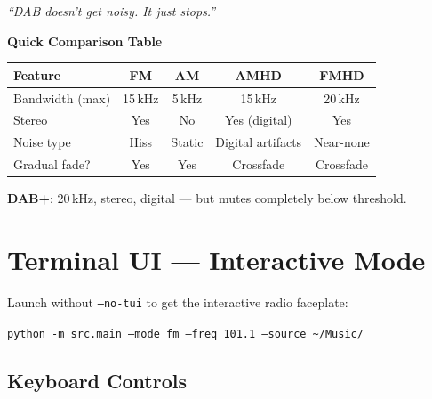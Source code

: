 \documentclass[11pt,a4paper]{article}
\newcommand{\cmd}[1]{\textcolor{radioDark}{\texttt{#1}}}
\begin{document}
\vspace{2mm}
\begin{center}
\textit{``DAB doesn't get noisy. It just stops.''}
\end{center}

\vspace{2mm}

\begin{center}
\begin{tcolorbox}[colback=radioLight, colframe=radioGray, width=0.85\textwidth]
\textbf{Quick Comparison Table}\\[2mm]
\begin{tabular}{@{}lcccc@{}}
    \toprule
    \textbf{Feature} & \textbf{FM} & \textbf{AM} & \textbf{AMHD} & \textbf{FMHD} \\
    \midrule
    Bandwidth (max) & 15\,kHz & 5\,kHz & 15\,kHz & 20\,kHz \\
    Stereo          & Yes & No & Yes (digital) & Yes \\
    Noise type      & Hiss & Static & Digital artifacts & Near-none \\
    Gradual fade?   & Yes & Yes & Crossfade & Crossfade \\
    \bottomrule
\end{tabular}

\vspace{1mm}
\textbf{DAB+}: 20\,kHz, stereo, digital --- but mutes completely below threshold.
\end{tcolorbox}
\end{center}

\section{Terminal UI --- Interactive Mode}

Launch without \cmd{--no-tui} to get the interactive radio faceplate:

\begin{center}
\cmd{python -m src.main --mode fm --freq 101.1 --source \textasciitilde/Music/}
\end{center}

\subsection*{Keyboard Controls}
\end{document}
